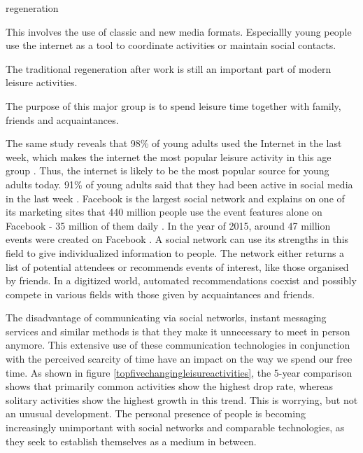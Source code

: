 \documentclass[12pt,numbers=noenddot,parskip,bibliography=totocnumbered,listof=totocnumbered]{scrreprt}
\begin{document}
\begin{labeling}{regeneration}
\item[media use] This involves the use of classic and new media formats. Especiallly young people use the internet as a tool to coordinate activities or maintain social contacts.
\item[regeneration] The traditional regeneration after work is still an important part of modern leisure activities.
\item[socialize] The purpose of this major group is to spend leisure time together with family, friends and acquaintances.
\end{labeling}

The same study reveals that 98\% of young adults used the Internet in the last week, which makes the internet the most popular leisure activity in this age group \cite{freizeitmonitor2016}. Thus, the internet is likely to be the most popular source for young adults today. 91\% of young adults said that they had been active in social media in the last week \cite{freizeitmonitor2016}. Facebook is the largest social network and explains on one of its marketing sites that 440 million people use the event features alone on Facebook - 35 million of them daily \citep{facebook2017}. In the year of 2015, around 47 million events were created on Facebook \citep{facebook2017}. A social network can use its strengths in this field to give individualized information to people. The network either returns a list of potential attendees or recommends events of interest, like those organised by friends. In a digitized world, automated recommendations coexist and possibly compete in various fields with those given by acquaintances and friends.

The disadvantage of communicating via social networks, instant messaging services and similar methods is that they make it unnecessary to meet in person anymore. This extensive use of these communication technologies in conjunction with the perceived scarcity of time have an impact on the way we spend our free time. As shown in figure \ref{topfivechangingleisureactivities}, the 5-year comparison shows that primarily common activities show the highest drop rate, whereas solitary activities show the highest growth in this trend. This is worrying, but not an unusual development. The personal presence of people is becoming increasingly unimportant with social networks and comparable technologies, as they seek to establish themselves as a medium in between.
\end{document}
